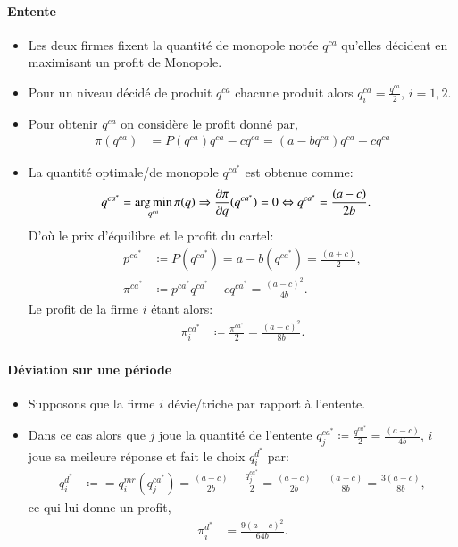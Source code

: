 \documentclass[notes, ignorenonframetext, compress, 9pt, xcolor=svgnames, aspectratio=169]{beamer}
\begin{document}
\begin{frame}
[allowframebreaks]{\insertsection}
\framesubtitle{Entente\\}

    \begin{itemize}
        \item Les deux firmes fixent la quantité de monopole notée $q^{ca}$ qu'elles décident en maximisant un profit de Monopole.
        \item Pour un niveau décidé de produit $q^{ca}$ chacune produit alors $q_i^{ca} = \frac{q^{ca}}{2}$, $i=1, 2$.
        \item Pour obtenir  $q^{ca}$  on considère le profit donné par,
        \begin{align*}
            \pi(q^{ca}) &= P(q^{ca})q^{ca} - cq^{ca} = (a-bq^{ca})q^{ca} - cq^{ca}
        \end{align*}
        \item La quantité optimale/de monopole $q^{ca^*}$ est obtenue comme:
        \begin{align}
            q^{ca^*} &=\argmin_{q^{ca}}  \pi(q) \Rightarrow \frac{\partial \pi}{\partial q}( q^{ca^*}) = 0 
            \Leftrightarrow  q^{ca^*} = \frac{(a-c)}{2b}.
            \label{eq3}
        \end{align}
        D'où le prix d'équilibre et le profit du cartel:
        \begin{align}
        p^{ca^*} &\coloneqq P(q^{ca^*}) = a - b\left(q^{ca^*}\right) = \frac{(a+c)}{2}, \nonumber\\
        \pi ^{ca^*} &\coloneqq p^{ca^*}  q^{ca^*}  - c q^{ca^*}  =  \frac{(a-c)^2}{4b}.
        \label{eq4}
        \end{align}
        Le profit de la firme $i$ étant alors:
        \begin{align}
        \pi_i ^{ca^*} &\coloneqq \frac{\pi ^{ca^*}}{2} = \frac{(a-c)^2}{8b}.
        \label{eq5}
        \end{align}
    \end{itemize}
    \end{frame}

\begin{frame}
[allowframebreaks]{\insertsection}
\framesubtitle{Déviation sur une période\\}
\begin{itemize}
\item Supposons que la firme $i$ dévie/triche par rapport à l'entente.
\item Dans ce cas alors que $j$ joue la quantité de l'entente  $q_j^{ca^*} \coloneqq \frac{q^{ca^*}}{2} =  \frac{(a-c)}{4b}$, $i$ joue sa meileure réponse 
et fait le choix $q_i^{d^*}$ par:
\begin{align}
q_i^{d^*} &\coloneqq = q_i^{mr}(q_j^{ca^*} ) = \frac{(a-c)}{2b} - \frac{q_j^{ca^*} }{2} = \frac{(a-c)}{2b} - \frac{(a-c)}{8b} = \frac{3(a-c)}{8b},
\label{eq6}
\end{align}
ce qui lui donne un profit,
\begin{align}
\pi_i^{d^*} &= \frac{9(a-c)^2}{64b}.
\label{eq7}
\end{align}
\end{itemize}
    \end{frame}
    
\end{document}
